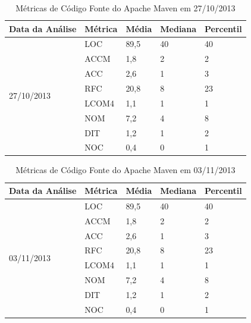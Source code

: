 \begin{apendicesenv}
\begin{table}[ht]
\centering
\begin{tabular}{|l|l|l|l|l|}
\hline
Data da Análise             & Métrica & Média & Mediana & Percentil \\ \hline
\multirow{8}{*}{27/10/2013} & LOC     & 89,5  & 40      & 40        \\ \cline{2-5} 
                            & ACCM    & 1,8   & 2       & 2         \\ \cline{2-5} 
                            & ACC     & 2,6   & 1       & 3         \\ \cline{2-5} 
                            & RFC     & 20,8  & 8       & 23        \\ \cline{2-5} 
                            & LCOM4   & 1,1   & 1       & 1         \\ \cline{2-5} 
                            & NOM     & 7,2   & 4       & 8         \\ \cline{2-5} 
                            & DIT     & 1,2   & 1       & 2         \\ \cline{2-5} 
                            & NOC     & 0,4   & 0       & 1         \\ \hline
\end{tabular}
\label{27/10}
\caption{Métricas de Código Fonte do Apache Maven em 27/10/2013}
\end{table}


\begin{table}[ht]
\centering
\begin{tabular}{|l|l|l|l|l|}
\hline
Data da Análise             & Métrica & Média & Mediana & Percentil \\ \hline
\multirow{8}{*}{03/11/2013} & LOC     & 89,5  & 40      & 40        \\ \cline{2-5} 
                            & ACCM    & 1,8   & 2       & 2         \\ \cline{2-5} 
                            & ACC     & 2,6   & 1       & 3         \\ \cline{2-5} 
                            & RFC     & 20,8  & 8       & 23        \\ \cline{2-5} 
                            & LCOM4   & 1,1   & 1       & 1         \\ \cline{2-5} 
                            & NOM     & 7,2   & 4       & 8         \\ \cline{2-5} 
                            & DIT     & 1,2   & 1       & 2         \\ \cline{2-5} 
                            & NOC     & 0,4   & 0       & 1         \\ \hline
\end{tabular}
\label{03/11}
\caption{Métricas de Código Fonte do Apache Maven em 03/11/2013}
\end{table}



\end{apendicesenv}
